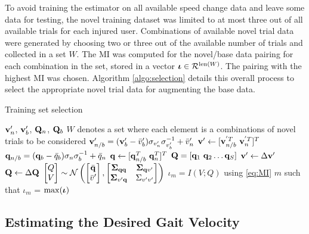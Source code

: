 To avoid training the estimator on all available speed change data and leave some data for testing, the novel training dataset was limited to at most three out of all available trials for each injured user. Combinations of available novel trial data were generated by choosing two or three out of the available number of trials and collected in a set $ W $. The MI was computed for the novel/base data pairing for each combination in the set, stored in a vector $ \boldsymbol{\iota} \in \mathcal{R}^{{\rm len}(W)}$. The pairing with the highest MI was chosen. Algorithm \ref{algo:selection} details this overall process to select the appropriate novel trial data for augmenting the base data.

\begin{algorithm}
	\caption{Training set selection}\label{algo:selection}
	\begin{algorithmic}[1]
		\Require $ \mathbf{v}'_n$, $\mathbf{v}'_b $, $ \mathbf{Q}_n $, $\mathbf{Q}_b$
		 $ W $ denotes a set where each element is a combinations of novel trials to be considered
		\State $ \mathbf{v}'_{n/b} = (\mathbf{v}'_b - \bar{v}'_b)\sigma_{v'_n} \sigma_{v'_b}^{-1} + \bar{v}'_n $ 
		\State $ \v' \leftarrow [\v_{n/b}^{'T}\ \v_{n}^{'T}]^T $
		\State $ \mathbf{q}_{n/b} = (\mathbf{q}_b - \bar{q}_b)\sigma_n \sigma_b^{-1} + \bar{q}_n $ 
		\State $ \mathbf{q} \leftarrow [\mathbf{q}_{n/b}^T\ \mathbf{q}_{n}^T]^T $
		\EndFor
		\State $ \mathbf{Q} = [\mathbf{q}_1 \ \mathbf{q}_2 \dots \mathbf{q}_S] $
		\State $ \mathbf{v}' \leftarrow \Delta \mathbf{v}' $
		\State $ \mathbf{Q} \leftarrow \Delta \mathbf{Q} $
		\vskip 5pt
		\State $ \begin{bmatrix}
			Q \\
			V
		\end{bmatrix} \sim \mathcal{N} \left( \begin{bmatrix}
			\bar{\mathbf{q}} \\
			\bar{v}'
		\end{bmatrix},\begin{bmatrix}
			\boldsymbol{\Sigma}_{\mathbf{q} \mathbf{q}} & \boldsymbol{\Sigma}_{\mathbf{q} v'} \\
			\boldsymbol{\Sigma}_{v' \mathbf{q}} & \Sigma_{v'v'}
		\end{bmatrix}\right) $
		\vskip 2pt
		\State $ \iota_m = I(V;Q) $ using \eqref{eq:MI}
		\EndFor
		\State \Return $m$ such that $\iota_m$ = $ \max(\boldsymbol{\iota}) $ 
	\end{algorithmic}
\end{algorithm}%

\subsection{Estimating the Desired Gait Velocity}

